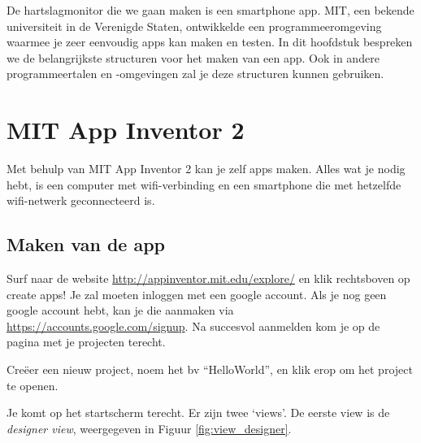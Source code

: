 
\begin{samenvatting}
De hartslagmonitor die we gaan maken is een smartphone app. MIT, een bekende universiteit in de Verenigde Staten, ontwikkelde een programmeeromgeving waarmee je zeer eenvoudig apps kan maken en testen. In dit hoofdstuk bespreken we de belangrijkste structuren voor het maken van een app. Ook in andere programmeertalen en -omgevingen zal je deze structuren kunnen gebruiken.
\end{samenvatting}
%

\section{MIT App Inventor 2}
\label{sec:Mod2_Sec1}
%
Met behulp van MIT App Inventor 2 kan je zelf apps maken. Alles wat je nodig hebt, is een computer met wifi-verbinding en een smartphone die met hetzelfde wifi-netwerk geconnecteerd is.

\subsection{Maken van de app}

Surf naar de website \url{http://appinventor.mit.edu/explore/} en klik rechtsboven op create apps! Je zal moeten inloggen met een google account. Als je nog geen google account hebt, kan je die aanmaken via \url{https://accounts.google.com/signup}. Na succesvol aanmelden kom je op de pagina met je projecten terecht. 

Cre\"eer een nieuw project, noem het bv \textquotedblleft HelloWorld\textquotedblright, en klik erop om het project te openen. 

Je komt op het startscherm terecht. Er zijn twee \textquoteleft views\textquoteright. De eerste view is de \emph{designer view}, weergegeven in Figuur \ref{fig:view_designer}.


